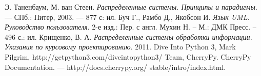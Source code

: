 %




\begin{thebibliography}{9}

  Э. Таненбаум, М. ван Стеен. 
  \emph{ Распределенные системы. Принципы и парадигмы}.
  — СПб.: Питер, 2003. — 877 с: ил.
	Буч Г., Рамбо Д., Якобсон И.
\emph{Язык UML. Руководство пользователя}. 
2-е изд.: Пер. с англ. Мухин Н. – М.: ДМК Пресс. – 496 с.: ил.
	Крищенко, В. А.
\emph{Распределенные системы обработки информации. Указания по курсовому проектированию}.
2011.
	Dive Into Python 3, Mark Pilgrim, http://getpython3.com/diveintopython3/
	Team, CherryPy. CherryPy Documentation. — http://docs.cherrypy.org/
stable/intro/index.html.

\end{thebibliography}
